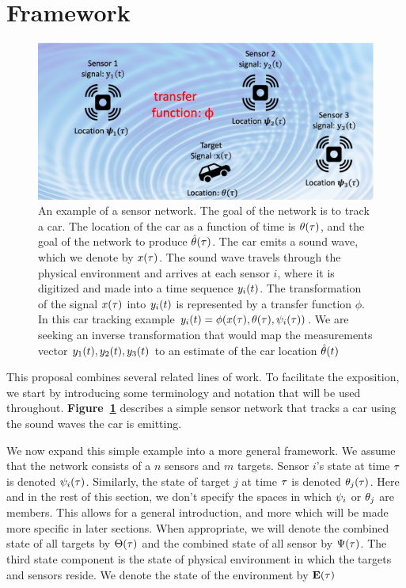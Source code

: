 \section{Framework}

\begin{figure}[t]
\centering
\includegraphics[width=0.9\columnwidth]{figs/Framework.jpg}
\caption{An example of a sensor network\label{fig:prototypicalSensorNetwork}. The goal of the network is to track a car. The location of the car as a function of time is $\theta(\tau)$, and the goal of the network to produce $\hat{\theta}(\tau)$. The car emits a sound wave, which we denote by $x(\tau)$. The sound wave travels through the physical environment and arrives at each sensor $i$, where it is digitized and made into a time sequence $y_i(t)$. The transformation of the signal $x(\tau)$ into $y_i(t)$ is represented by a transfer function $\phi$. In this car tracking example 
$y_i(t) = \phi(x(\tau),\theta(\tau),\psi_i(\tau))$. We are seeking an inverse transformation that would map the measurements vector $y_1(t),y_2(t),y_3(t)$ to an estimate of the car location $\hat{\theta}(t)$}
\end{figure}

This proposal combines several related lines of work. To facilitate the exposition, we start by introducing some terminology and notation that will be used throughout. {\bf Figure~\ref{fig:prototypicalSensorNetwork}} describes a simple sensor network that tracks a car using the sound waves the car is emitting.

We now expand this simple example into a more general framework.
We assume that the network consists of a $n$ sensors and $m$ 
targets. Sensor $i$'s state at time $\tau$ is denoted $\psi_i(\tau)$.  Similarly, the state of target $j$ at time $\tau$ is denoted $\theta_j(\tau)$.
Here and in the rest of this section, we don't specify the spaces in which  $\psi_i$ or $\theta_j$ are members. This allows for a general introduction, and more which will be made more specific in later sections. When appropriate, we will denote the combined state of all targets by $\Theta(\tau)$ and the combined state of all sensor by $\Psi(\tau)$. The third state component is the state of physical environment in which the targets and sensors reside. We denote the state of the environment by $\mathbf{E}(\tau)$

